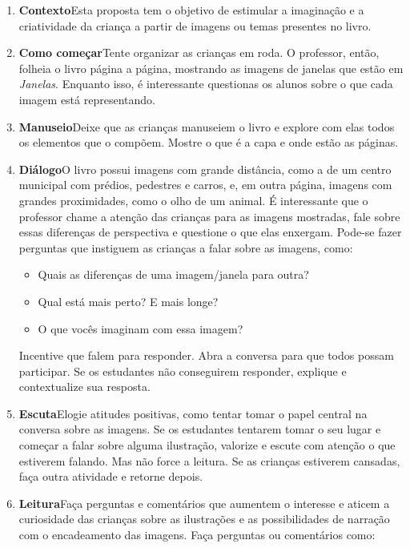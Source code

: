 \documentclass[11pt]{extarticle}
\begin{document}
\begin{enumerate}
\item \textbf{Contexto}\quad Esta proposta tem o objetivo de estimular a imaginação e a criatividade da criança a partir de imagens ou temas presentes no livro.  
 
\item \textbf{Como começar}\quad Tente organizar as crianças em roda. O professor, então, folheia o livro página a página, mostrando as imagens de janelas que estão em \textit{Janelas}. Enquanto isso, é interessante questionas os alunos sobre o que cada imagem está representando.

\item \textbf{Manuseio}\quad Deixe que as crianças manuseiem o livro 
e explore com elas todos os elementos que o compõem. Mostre o que é a 
capa e onde estão as páginas.

\item \textbf{Diálogo}\quad O livro possui imagens com grande distância, como a de um centro municipal com prédios, pedestres e carros, e, em outra página, imagens com grandes proximidades, como o olho de um animal. É interessante que o professor chame a atenção das crianças para as imagens mostradas, fale sobre essas diferenças de perspectiva e questione o que elas enxergam. Pode-se fazer perguntas que instiguem as crianças a falar sobre as imagens, como:

\begin{itemize}
\item Quais as diferenças de uma imagem/janela para outra?
\item Qual está mais perto? E mais longe?
\item O que vocês imaginam com essa imagem?
\end{itemize}

Incentive que falem para responder.
Abra a conversa para que todos possam participar. Se os estudantes não 
conseguirem responder, explique e contextualize sua
resposta.

\item \textbf{Escuta}\quad Elogie atitudes positivas, como 
tentar tomar o papel central na conversa sobre as imagens. Se os estudantes tentarem 
tomar o seu lugar e começar a falar sobre alguma ilustração, valorize e escute com atenção o que estiverem falando. Mas não 
force a leitura. Se as crianças estiverem cansadas, faça outra atividade 
e retorne depois. 

\item \textbf{Leitura}\quad Faça perguntas e comentários que aumentem o 
interesse e aticem a curiosidade das crianças sobre as ilustrações e as possibilidades de narração com o encadeamento das imagens. Faça 
perguntas ou comentários como: 


\end{enumerate}
\end{document}
